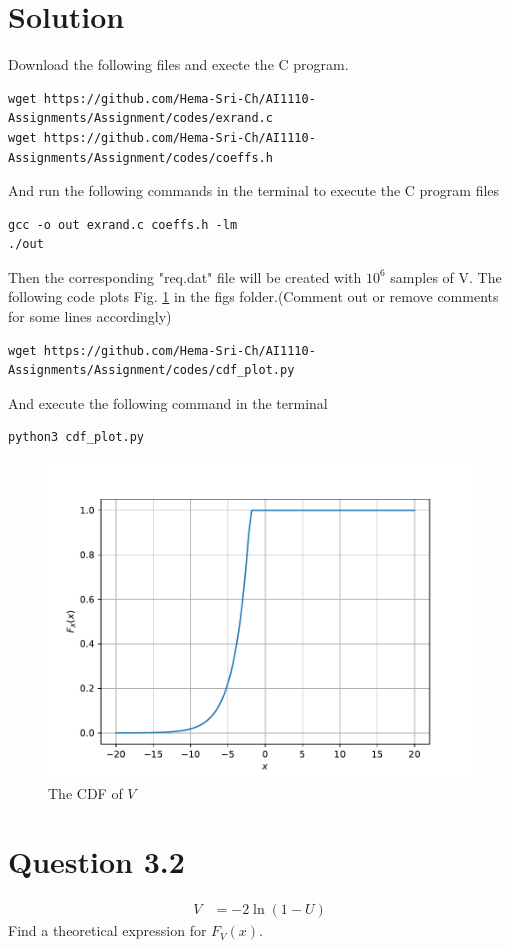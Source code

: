 \documentclass[16pt, a4paper, two column]{article}
\begin{document}
\section*{Solution}
Download the following files and execte the C program.
\begin{lstlisting}
wget https://github.com/Hema-Sri-Ch/AI1110-Assignments/Assignment/codes/exrand.c
wget https://github.com/Hema-Sri-Ch/AI1110-Assignments/Assignment/codes/coeffs.h
\end{lstlisting}
And run the following commands in the terminal to execute the C program files
\begin{lstlisting}
gcc -o out exrand.c coeffs.h -lm
./out
\end{lstlisting}
Then the corresponding "req.dat" file will be created with $10^6$ samples of V.
The following code plots Fig. \ref{fig:req_cdf} in the figs folder.(Comment out or remove comments for some lines accordingly)
\begin{lstlisting}
wget https://github.com/Hema-Sri-Ch/AI1110-Assignments/Assignment/codes/cdf_plot.py
\end{lstlisting}
And execute the following command in the terminal 
\begin{lstlisting}
python3 cdf_plot.py
\end{lstlisting}
\begin{figure}[h]
	\centering
	\includegraphics[width=\columnwidth]{req_cdf}
	\caption{The CDF of $V$}
	\label{fig:req_cdf}
\end{figure}
\section*{Question 3.2}
\begin{align}
	V &= -2 \ln(1-U)
\end{align}
Find a theoretical expression for $F_V(x)$.
\end{document}
